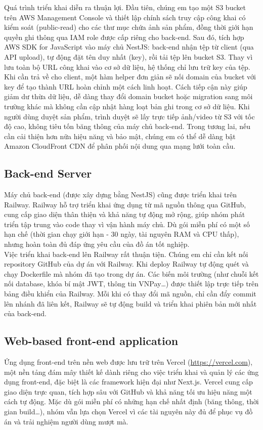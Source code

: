Quá trình triển khai diễn ra thuận lợi. Đầu tiên, chúng em tạo một S3 bucket trên AWS Management Console và thiết lập chính sách truy cập công khai có kiểm soát (public-read) cho các thư mục chứa ảnh sản phẩm, đồng thời giới hạn quyền ghi thông qua IAM role được cấp riêng cho back-end. Sau đó, tích hợp AWS SDK for JavaScript vào máy chủ NestJS: back-end nhận tệp từ client (qua API upload), tự động đặt tên duy nhất (key), rồi tải tệp lên bucket S3. Thay vì lưu toàn bộ URL công khai vào cơ sở dữ liệu, hệ thống chỉ lưu trữ key của tệp. Khi cần trả về cho client, một hàm helper đơn giản sẽ nối domain của bucket với key để tạo thành URL hoàn chỉnh một cách linh hoạt. Cách tiếp cận này giúp giảm dư thừa dữ liệu, dễ dàng thay đổi domain bucket hoặc migration sang môi trường khác mà không cần cập nhật hàng loạt bản ghi trong cơ sở dữ liệu. Khi người dùng duyệt sản phẩm, trình duyệt sẽ lấy trực tiếp ảnh/video từ S3 với tốc độ cao, không tiêu tốn băng thông của máy chủ back-end. Trong tương lai, nếu cần cải thiện hơn nữa hiệu năng và bảo mật, chúng em có thể dễ dàng bật Amazon CloudFront CDN để phân phối nội dung qua mạng lưới toàn cầu. \\

\subsection{Back-end Server}
Máy chủ back-end (được xây dựng bằng NestJS) cũng được triển khai trên Railway. Railway hỗ trợ triển khai ứng dụng từ mã nguồn thông qua GitHub, cung cấp giao diện thân thiện và khả năng tự động mở rộng, giúp nhóm phát triển tập trung vào code thay vì vận hành máy chủ. Dù gói miễn phí có một số hạn chế (thời gian chạy giới hạn - 30 ngày, tài nguyên RAM và CPU thấp), nhưng hoàn toàn đủ đáp ứng yêu cầu của đồ án tốt nghiệp. \\

Việc triển khai back-end lên Railway rất thuận tiện. Chúng em chỉ cần kết nối repository GitHub của dự án với Railway. Khi deploy Railway tự động quét và chạy Dockerfile mà nhóm đã tạo trong dự án. Các biến môi trường (như chuỗi kết nối database, khóa bí mật JWT, thông tin VNPay…) được thiết lập trực tiếp trên bảng điều khiển của Railway. Mỗi khi có thay đổi mã nguồn, chỉ cần đẩy commit lên nhánh đã liên kết, Railway sẽ tự động build và triển khai phiên bản mới nhất của back-end. \\

\subsection{Web-based front-end application}
Ứng dụng front-end trên nền web được lưu trữ trên Vercel (\url{https://vercel.com}), một nền tảng đám mây thiết kế dành riêng cho việc triển khai và quản lý các ứng dụng front-end, đặc biệt là các framework hiện đại như Next.js. Vercel cung cấp giao diện trực quan, tích hợp sâu với GitHub và khả năng tối ưu hiệu năng một cách tự động. Mặc dù gói miễn phí có những hạn chế nhất định (băng thông, thời gian build…), nhóm vẫn lựa chọn Vercel vì các tài nguyên này đủ để phục vụ đồ án và trải nghiệm người dùng mượt mà. \\


